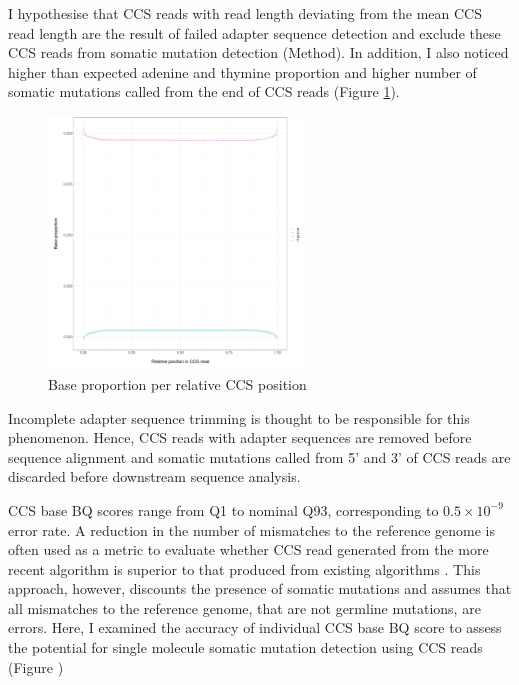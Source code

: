 I hypothesise that CCS reads with read length deviating from the mean CCS read length are the result of failed adapter sequence detection and exclude these CCS reads from somatic mutation detection (Method). In addition, I also noticed higher than expected adenine and thymine proportion and higher number of somatic mutations called from the end of CCS reads (Figure \ref{figure:base-proportion-per-ccs-position}). 

\begin{figure}[h!]
\caption{Base proportion per relative CCS position}
\label{figure:base-proportion-per-ccs-position}
\begin{centering}
\includegraphics[width=0.6\textwidth]{Vector/base_proportion_per_ccs_position.pdf}
\end{centering}
\end{figure}

Incomplete adapter sequence trimming is thought to be responsible for this phenomenon. Hence, CCS reads with adapter sequences are removed before sequence alignment and somatic mutations called from 5’ and 3’ of CCS reads are discarded before downstream sequence analysis. 

CCS base BQ scores range from Q1 to nominal Q93, corresponding to $0.5\times10^{-9}$ error rate. A reduction in the number of mismatches to the reference genome is often used as a metric to evaluate whether CCS read generated from the more recent algorithm is superior to that produced from existing algorithms \cite{Wenger2019-pw, Baid2022-or}. This approach, however, discounts the presence of somatic mutations and assumes that all mismatches to the reference genome, that are not germline mutations, are errors. Here, I examined the accuracy of individual CCS base BQ score to assess the potential for single molecule somatic mutation detection using CCS reads (Figure )   

